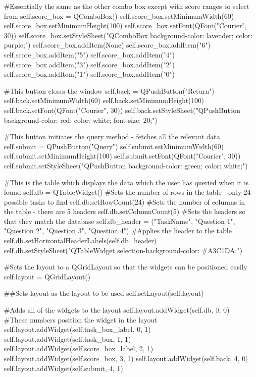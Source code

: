 \begin{landscape}
\begin{python}
        #Essentially the same as the other combo box except with score ranges to select from
        self.score_box = QComboBox()
        self.score_box.setMinimumWidth(60)
        self.score_box.setMinimumHeight(100)
        self.score_box.setFont(QFont("Courier", 30))
        self.score_box.setStyleSheet("QComboBox {background-color: lavender; color: purple;}")
        self.score_box.addItem(None)
        self.score_box.addItem("6")
        self.score_box.addItem("5")
        self.score_box.addItem("4")
        self.score_box.addItem("3")
        self.score_box.addItem("2")
        self.score_box.addItem("1")
        self.score_box.addItem("0")

        #This button closes the window
        self.back = QPushButton("Return")
        self.back.setMinimumWidth(60)
        self.back.setMinimumHeight(100)
        self.back.setFont(QFont("Courier", 30))
        self.back.setStyleSheet("QPushButton {background-color: red; color: white; font-size: 20;}")
        
        #This button initiates the query method - fetches all the relevant data
        self.submit = QPushButton("Query")
        self.submit.setMinimumWidth(60)
        self.submit.setMinimumHeight(100)
        self.submit.setFont(QFont("Courier", 30))
        self.submit.setStyleSheet("QPushButton {background-color: green; color: white;}")

        #This is the table which displays the data which the user has queried when it is found
        self.db = QTableWidget()
        #Sets the number of rows in the table - only 24 possible tasks to find
        self.db.setRowCount(24)
        #Sets the number of columns in the table - there are 5 headers
        self.db.setColumnCount(5)
        #Sets the headers so that they match the database
        self.db_header = ("TaskName", "Question 1", "Question 2", "Question 3", "Question 4")
        #Applies the header to the table
        self.db.setHorizontalHeaderLabels(self.db_header)
        self.db.setStyleSheet("QTableWidget {selection-background-color: #A3C1DA;}")

        #Sets the layout to a QGridLayout so that the widgets can be positioned easily
        self.layout = QGridLayout()

        ##Sets layout as the layout to be used
        self.setLayout(self.layout)

        #Adds all of the widgets to the layout
        self.layout.addWidget(self.db, 0, 0) #These numbers position the widget in the layout
        self.layout.addWidget(self.task_box_label, 0, 1)
        self.layout.addWidget(self.task_box, 1, 1)
        self.layout.addWidget(self.score_box_label, 2, 1)
        self.layout.addWidget(self.score_box, 3, 1)
        self.layout.addWidget(self.back, 4, 0)
        self.layout.addWidget(self.submit, 4, 1)


\end{python}
\end{landscape}
